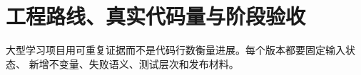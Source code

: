 \chapter{工程路线、真实代码量与阶段验收}

\begin{keyidea}
大型学习项目用可重复证据而不是代码行数衡量进展。每个版本都要固定输入状态、
新增不变量、失败语义、测试层次和发布材料。
\end{keyidea}





